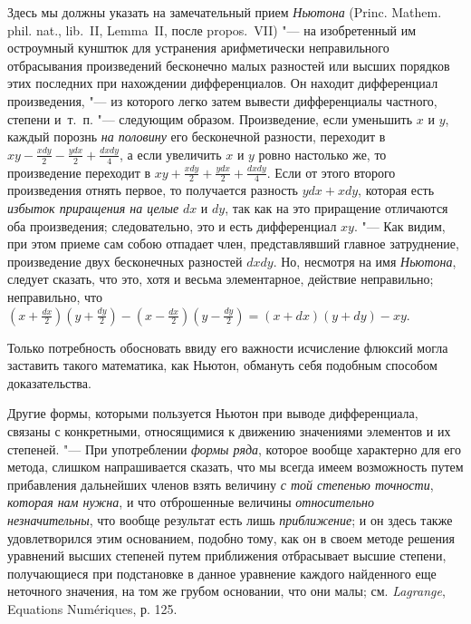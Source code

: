 Здесь мы должны указать на замечательный прием {\em Ньютона}
(Princ. Mathem. phil. nat., lib.~II, Lemma~II, после propos.~VII)
"--- на изобретенный им остроумный кунштюк для устранения арифметически
неправильного отбрасывания произведений бесконечно малых разностей или
высших порядков этих последних при нахождении дифференциалов. Он находит
дифференциал произведения, "--- из которого легко затем вывести дифференциалы
частного, степени и~т.~п. "--- следующим образом. Произведение, если уменьшить
$x$ и $y$, каждый порознь
{\em на половину} его бесконечной разности, переходит в
$xy - \frac {xdy} 2 - \frac {ydx} 2 + \frac {dxdy} 4$,
а если увеличить $x$ и $y$ ровно настолько же, то произведение
переходит в $xy + \frac {xdy} 2 + \frac {ydx} 2 + \frac {dxdy} 4$.
Если от этого второго произведения отнять первое, то получается
разность $ydx + xdy$, которая есть {\em избыток приращения на целые}
$dx$ и $dy$, так как на это
приращение отличаются оба произведения; следовательно, это и есть
дифференциал $xy$. "--- Как видим, при этом приеме сам собою
отпадает член, представлявший главное затруднение, произведение двух
бесконечных разностей $dxdy$. Но, несмотря на имя
{\em Ньютона}, следует сказать, что это, хотя и весьма
элементарное, действие неправильно; неправильно, что
$\left(x+\frac{dx} 2\right)\left(y+\frac{dy}
2\right)-\left(x-\frac{dx} 2\right)\left(y-\frac{dy}
2\right)=\left(x+dx\right)\left(y+dy\right)-xy$.

Только потребность обосновать ввиду его важности исчисление флюксий могла
заставить такого математика, как Ньютон, обмануть себя подобным способом
доказательства.

Другие формы, которыми пользуется Ньютон при выводе дифференциала, связаны с
конкретными, относящимися к движению значениями элементов и их степеней. "---
При употреблении {\em формы ряда}, которое вообще
характерно для его метода, слишком напрашивается сказать, что мы всегда
имеем возможность путем прибавления дальнейших членов взять величину
{\em с той степенью точности},
{\em которая нам нужна}, и что отброшенные величины
{\em относительно незначительны}, что вообще результат
есть лишь {\em приближение}; и он здесь также
удовлетворился этим основанием, подобно тому, как он в своем методе решения
уравнений высших степеней путем приближения отбрасывает высшие степени,
получающиеся при подстановке в данное уравнение каждого найденного еще
неточного значения, на том же грубом основании, что они малы; см.
{\em Lagrange}, Equations Numériques, р. 125.

